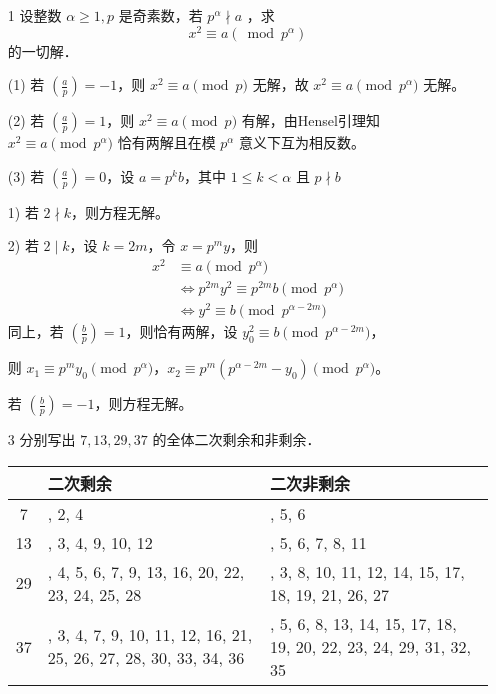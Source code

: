 \begin{enumerate}
    \item[1] 设整数 $\alpha \geqslant 1, p$ 是奇素数，若 $p^\alpha \nmid a$ ，求
    $$
    x^2 \equiv a\left(\bmod p^\alpha\right)
    $$
    的一切解．

\begin{solution}
    (1) 若 $\left(\frac{a}{p}\right) = -1$，则 $x^2 \equiv a \pmod{p}$ 无解，故 $x^2 \equiv a \pmod{p^\alpha}$ 无解。
        
    (2) 若 $\left(\frac{a}{p}\right) = 1$，则 $x^2 \equiv a \pmod{p}$ 有解，由Hensel引理知 $x^2 \equiv a \pmod{p^\alpha}$ 恰有两解且在模 $p^\alpha$ 意义下互为相反数。
    
    (3) 若 $\left(\frac{a}{p}\right) = 0$，设 $a = p^k b$，其中 $1 \leq k < \alpha$ 且 $p \nmid b$
    
    1) 若 $2 \nmid k$，则方程无解。
    
    2) 若 $2 \mid k$，设 $k = 2m$，令 $x = p^m y$，则
    \begin{align*}
    x^2 &\equiv a \pmod{p^\alpha}\\
    &\Longleftrightarrow p^{2m} y^2 \equiv p^{2m} b \pmod{p^\alpha}\\
    &\Longleftrightarrow y^2 \equiv b \pmod{p^{\alpha-2m}}
    \end{align*}
    同上，若 $\left(\frac{b}{p}\right) = 1$，则恰有两解，设 $y_0^2 \equiv b \pmod{p^{\alpha-2m}}$，
    
    则 $x_1 \equiv p^m y_0 \pmod{p^\alpha}$，$x_2 \equiv p^m(p^{\alpha-2m} - y_0) \pmod{p^\alpha}$。
    
    若 $\left(\frac{b}{p}\right) = -1$，则方程无解。
\end{solution}

    \item[3] 分别写出 $7,13,29,37$ 的全体二次剩余和非剩余．

\begin{solution}
    \small 
    \begin{tabular}{|c|>{\raggedright\arraybackslash}p{5.5cm}|>{\raggedright\arraybackslash}p{5.5cm}|}
        \hline
        & 二次剩余 & 二次非剩余 \\
        \hline
        7 & 1, 2, 4 & 3, 5, 6 \\
        \hline
        13 & 1, 3, 4, 9, 10, 12 & 2, 5, 6, 7, 8, 11 \\
        \hline
        29 & 1, 4, 5, 6, 7, 9, 13, 16, 20, 22, 23, 24, 25, 28 & 2, 3, 8, 10, 11, 12, 14, 15, 17, 18, 19, 21, 26, 27 \\
        \hline
        37 & 1, 3, 4, 7, 9, 10, 11, 12, 16, 21, 25, 26, 27, 28, 30, 33, 34, 36 & 2, 5, 6, 8, 13, 14, 15, 17, 18, 19, 20, 22, 23, 24, 29, 31, 32, 35 \\
        \hline
    \end{tabular}
\end{solution}


\end{enumerate}
